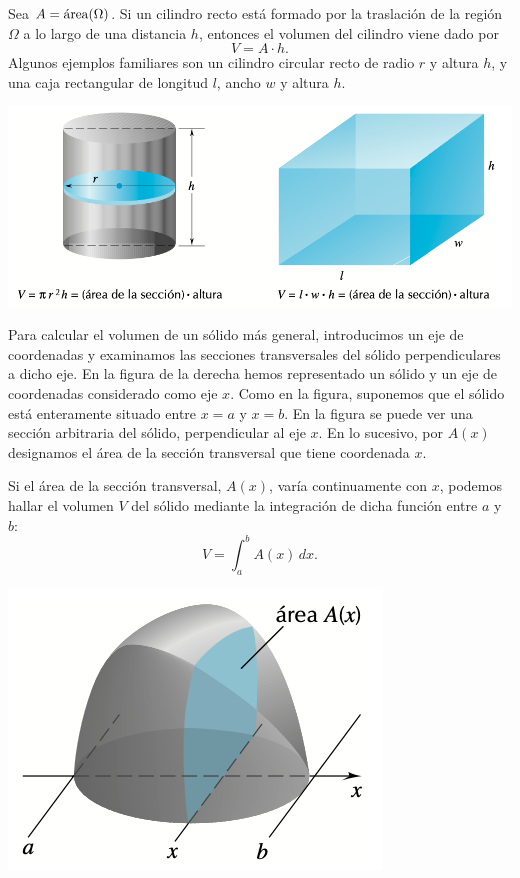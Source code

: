 Sea $A=\mathrm{\protect\acute{a}rea}(\Omega)$. Si un cilindro recto está formado por la traslación de la región $\Omega$ a lo largo de una distancia $h$, entonces el volumen del cilindro viene dado por 
\[
V = A\cdot h.
\]
Algunos ejemplos familiares son un cilindro circular recto de radio \( r \) y altura \( h \), y una caja rectangular de longitud \( l \), ancho \( w \) y altura \( h \).

\begin{center}
  \includegraphics[width=.6\textwidth]{pics/cilindro-prisma.png}
\end{center}

\noindent
\begin{minipage}{.65\textwidth}
Para calcular el volumen de un sólido más general, introducimos un eje de coordenadas y examinamos las secciones transversales del sólido perpendiculares a dicho eje. En la figura de la derecha hemos representado un sólido y un eje de coordenadas considerado como eje \( x \).
Como en la figura, suponemos que el sólido está enteramente situado entre \( x = a \) y \( x = b \). En la figura se puede ver una sección arbitraria del sólido, perpendicular al eje \( x \). En lo sucesivo, por \( A(x) \) designamos el área de la sección transversal que tiene coordenada \( x \).

Si el área de la sección transversal, \( A(x) \), varía continuamente con \( x \), podemos hallar el volumen \( V \) del sólido mediante la integración de dicha función entre \( a \) y \( b \):
\begin{equation} \label{eq:volumen}
V = \int_a^b A(x) \, dx.
\end{equation}

\end{minipage}
\begin{minipage}{.34\textwidth}
  \begin{center}
    \includegraphics[width=.9\textwidth]{pics/volumen-1.png}
  \end{center}
\end{minipage}

